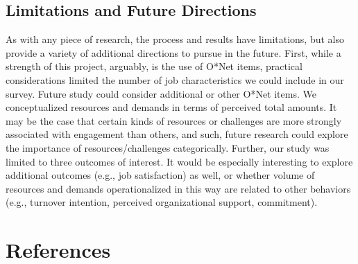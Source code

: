 \documentclass[
  man]{apa6}
\begin{document}
\hypertarget{limitations-and-future-directions}{%
\subsection{Limitations and Future Directions}\label{limitations-and-future-directions}}

As with any piece of research, the process and results have limitations, but also provide a variety of additional directions to pursue in the future. First, while a strength of this project, arguably, is the use of O*Net items, practical considerations limited the number of job characteristics we could include in our survey. Future study could consider additional or other O*Net items. We conceptualized resources and demands in terms of perceived total amounts. It may be the case that certain kinds of resources or challenges are more strongly associated with engagement than others, and such, future research could explore the importance of resources/challenges categorically. Further, our study was limited to three outcomes of interest. It would be especially interesting to explore additional outcomes (e.g., job satisfaction) as well, or whether volume of resources and demands operationalized in this way are related to other behaviors (e.g., turnover intention, perceived organizational support, commitment).

\newpage

\hypertarget{references}{%
\section{References}\label{references}}

\begingroup
\setlength{\parindent}{-0.5in}
\setlength{\leftskip}{0.5in}
\end{document}
